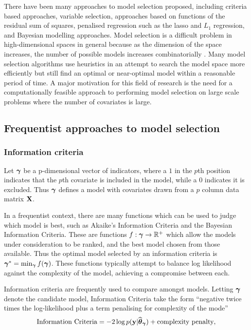 There have been many approaches to model selection proposed, including criteria
based approaches, variable selection, approaches based on functions of the
residual sum of squares, penalised regression such as the lasso and $L_1$
regression, and Bayesian modelling approaches. Model selection is a difficult
problem in high-dimensional spaces in general because as the dimension of the
space increases, the number of possible models increases combinatorially
\citep{Schelldorfer2010}. Many model selection algorithms use heuristics in an
attempt to search the model space more efficiently but still find an optimal or
near-optimal model within a reasonable period of time. A major motivation for
this field of research is the need for a computationally feasible approach to
performing model selection on large scale problems where the number of
covariates is large.

\subsection{Frequentist approaches to model selection}
\subsubsection{Information criteria}

Let ${\boldsymbol \gamma}$ be a p-dimensional vector of indicators, where a $1$ in the $p$th
position indicates that the $p$th covariate is included in the model, while a
$0$ indicates it is excluded. Thus ${\boldsymbol \gamma}$ defines a model with covariates
drawn from a $p$ column data matrix ${\bf X}$.

In a frequentist context, there are many functions which can be used to judge
which model is best, such as Akaike's Information Criteria and the Bayesian
Information Criteria. These are functions $f: {\boldsymbol \gamma} \to {\mathbb{R}}^+$ which allow the
models under consideration to be ranked, and the best model chosen from those
available. Thus the optimal model selected by an information criteria is
${\boldsymbol \gamma}^* = \min_{\boldsymbol \gamma} f({\boldsymbol \gamma})$. These functions typically attempt to
balance log likelihood against the complexity of the model, achieving a
compromise between each.


Information criteria are frequently used to compare amongst models. Letting
${\boldsymbol \gamma}$ denote the candidate model, Information Criteria take the form
``negative twice times the log-likelihood plus a term penalising for complexity
of the mode''
$$
	\text{Information Criteria} = -2 \log p({\bf y} | \widehat{{\boldsymbol \theta}}_{\boldsymbol \gamma}) + \text{complexity penalty},
$$


